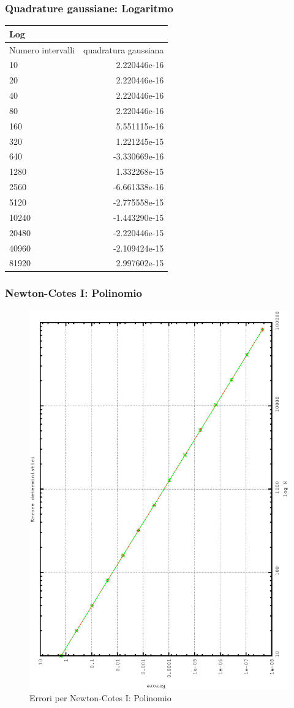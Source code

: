 \subsubsection{Quadrature gaussiane: Logaritmo}
\begin{center}
\begin{longtable}[h]{lr}
\toprule
Log & \\
\midrule
Numero intervalli & quadratura gaussiana \\
10 &	2.220446e-16 \\
20 &	2.220446e-16 \\
40 &	2.220446e-16 \\ 
80 &	2.220446e-16 \\
160 &	5.551115e-16 \\ 
320 & 	1.221245e-15 \\
640 &	-3.330669e-16 \\ 
1280 &	1.332268e-15 \\
2560 &	 -6.661338e-16 \\
5120 &	 -2.775558e-15 \\ 
10240 &	-1.443290e-15 \\ 
20480 &	 -2.220446e-15 \\
40960 &	 -2.109424e-15 \\ 
81920 &	2.997602e-15 \\
\midrule

\bottomrule
\end{longtable}
\end{center}

\subsubsection{Newton-Cotes I: Polinomio}
\begin{figure}[!h]
\includegraphics[width=0.7\columnwidth,angle=-90]{plot_trap_poly.eps}
\caption{\small{Errori per Newton-Cotes I: Polinomio}}
\end{figure}

